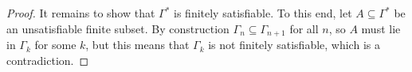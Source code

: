 \documentclass[a4paper]{article}
\begin{document}
\begin{proof}
  It remains to show that $\Gamma^*$ is finitely satisfiable.
  To this end, let $A \subseteq \Gamma^*$ be an unsatisfiable finite subset.
  By construction $\Gamma_{n} \subseteq \Gamma_{n+1}$ for all $n$, so $A$ must lie in $\Gamma_{k}$ for some $k$, but this means that $\Gamma_{k}$ is not finitely satisfiable, which is a contradiction.
\end{proof}


\end{document}
